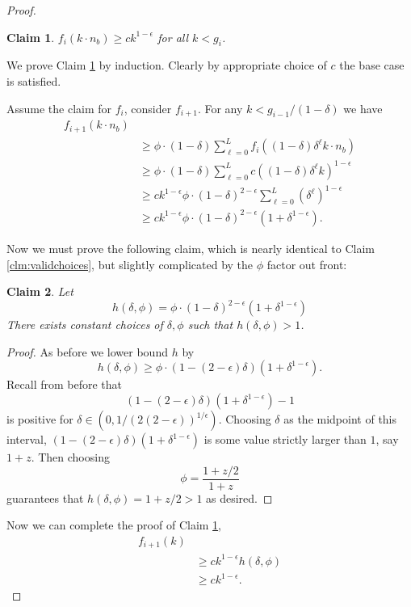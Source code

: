 \documentclass[twocolumn]{article}[10pt]
\newtheorem{clm}{Claim}
\begin{document}
\begin{proof}
  \begin{clm}
    \label{clm:fikinductionagain}
    $f_i(k \cdot n_b) \ge ck^{1-\epsilon}$ for all $k < g_i$.
  \end{clm}
  We prove Claim \ref{clm:fikinductionagain} by induction. Clearly by
  appropriate choice of $c$ the base case is satisfied.

  Assume the claim for $f_i$, consider $f_{i+1}$. For any $k < g_{i-1}/(1-\delta)$ we have
  \begin{align*}
    f_{i+1}(k\cdot n_b) & \\
                  &\ge \phi\cdot(1-\delta)\sum_{\ell=0}^L f_i((1-\delta)\delta^\ell k\cdot n_b)\\
                  &\ge \phi\cdot(1-\delta)\sum_{\ell=0}^L c ((1-\delta)\delta^\ell k)^{1-\epsilon}\\
                  &\ge ck^{1-\epsilon} \phi\cdot(1-\delta)^{2-\epsilon}\sum_{\ell=0}^L (\delta^\ell)^{1-\epsilon}\\
                  &\ge ck^{1-\epsilon} \phi\cdot(1-\delta)^{2-\epsilon}( 1+\delta^{1-\epsilon}).
  \end{align*}

  Now we must prove the following claim, which is nearly identical to Claim
  \ref{clm:validchoices}, but slightly complicated by the $\phi$ factor out front:
  \begin{clm}
    Let 
    $$h(\delta, \phi) = \phi\cdot (1-\delta)^{2-\epsilon}(1+\delta^{1-\epsilon})$$
    There exists constant choices of $\delta, \phi$ such that $h(\delta, \phi) > 1$.
  \end{clm}
  \begin{proof}
    As before we lower bound $h$ by 
    $$h(\delta, \phi) \ge \phi \cdot (1-(2-\epsilon)\delta)(1+\delta^{1-\epsilon}).$$
    Recall from before that 
    $$(1-(2-\epsilon)\delta)(1+\delta^{1-\epsilon}) -1$$ is positive for
    $\delta \in (0, 1/(2(2-\epsilon))^{1/\epsilon})$. Choosing $\delta$ as the
    midpoint of this interval, $(1-(2-\epsilon)\delta)(1+\delta^{1-\epsilon})$
    is some value strictly larger than $1$, say $1+z$. Then
    choosing $$\phi = \frac{1+z/2}{1+z}$$
    guarantees that $h(\delta, \phi) = 1+z/2 > 1$ as desired.
  \end{proof}

  Now we can complete the proof of Claim \ref{clm:fikinductionagain}, 
  \begin{align*}
    f_{i+1}(k) & \\
               &\ge ck^{1-\epsilon} h(\delta, \phi)\\
               &\ge ck^{1-\epsilon}.
  \end{align*}


\end{proof}
\end{document}

